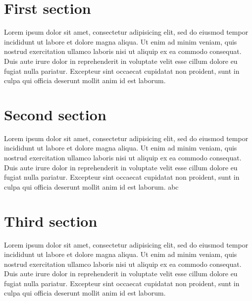 \documentclass[11pt]{article}
\begin{document}
\section{First section}

Lorem ipsum dolor sit amet, consectetur adipisicing elit, sed do eiusmod tempor incididunt ut labore et dolore magna aliqua. Ut enim ad minim veniam, quis nostrud exercitation ullamco laboris nisi ut aliquip ex ea commodo consequat. Duis aute irure dolor in reprehenderit in voluptate velit esse cillum dolore eu fugiat nulla pariatur. Excepteur sint occaecat cupidatat non proident, sunt in culpa qui officia deserunt mollit anim id est laborum.

\section{Second section}

Lorem ipsum dolor sit amet, consectetur adipisicing elit, sed do eiusmod tempor incididunt ut labore et dolore magna aliqua. Ut enim ad minim veniam, quis nostrud exercitation ullamco laboris nisi ut aliquip ex ea commodo consequat. Duis aute irure dolor in reprehenderit in voluptate velit esse cillum dolore eu fugiat nulla pariatur. Excepteur sint occaecat cupidatat non proident, sunt in culpa qui officia deserunt mollit anim id est laborum.
abc
\newpage

\section{Third section}

Lorem ipsum dolor sit amet, consectetur adipisicing elit, sed do eiusmod tempor incididunt ut labore et dolore magna aliqua. Ut enim ad minim veniam, quis nostrud exercitation ullamco laboris nisi ut aliquip ex ea commodo consequat. Duis aute irure dolor in reprehenderit in voluptate velit esse cillum dolore eu fugiat nulla pariatur. Excepteur sint occaecat cupidatat non proident, sunt in culpa qui officia deserunt mollit anim id est laborum.
\end{document}
